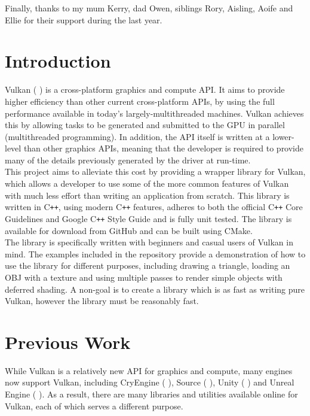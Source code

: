 \documentclass[12pt]{report}
\newcommand{\citebu}[1]{(\citenoparen{#1})}
\newcommand{\citenoparen}[1]{\citeauthor{#1} \citeyear{#1}}
\newcommand{\citesoftware}[1]{(\citeauthor{#1} \citeyear{#1})}
\newcommand{\cpp}{C\texttt{++}}
\theoremstyle{definition}
\begin{document}
    Finally, thanks to my mum Kerry, dad Owen, siblings Rory, Aisling, Aoife and Ellie for
    their support during the last year. \\

  \tableofcontents

  \listoffigures

  \chapter{Introduction}
    Vulkan \citesoftware{vulkan} is a cross-platform graphics and compute API.
    It aims to provide higher efficiency than other current
    cross-platform APIs, by using the full performance available in today's
    largely-multithreaded machines. Vulkan achieves this by allowing tasks to be
    generated and submitted to the GPU in parallel (multithreaded programming).
    In addition, the API itself is written at a lower-level than other graphics
    APIs, meaning that the developer is required to provide many of the details
    previously generated by the driver at run-time.\\

    This project aims to alleviate this cost by providing a wrapper library for
    Vulkan, which allows a developer to use some of the more common features of
    Vulkan with much less effort than writing an application from scratch. This
    library is written in \cpp{}, using modern \cpp{} features, adheres to both the
    official \cpp{} Core Guidelines and Google \cpp{} Style Guide and is fully unit
    tested. The library is available for download from GitHub and can be built
    using CMake.\\

    The library is specifically written with beginners and casual users of
    Vulkan in mind. The examples included in the repository provide a
    demonstration of how to use the library for different purposes, including
    drawing a triangle, loading an OBJ with a texture and using multiple passes
    to render simple objects with deferred shading. A non-goal is to create a
    library which is as fast as writing pure Vulkan, however the library
    must be reasonably fast.\\

  \chapter{Previous Work}

    While Vulkan is a relatively new API for graphics and compute, many engines
    now support Vulkan, including CryEngine \citebu{cryengine}, Source \citebu{source}, Unity \citebu{unity} and Unreal
    Engine \citebu{ue4}. As a result, there are many libraries and utilities available
    online for Vulkan, each of which serves a different purpose.
\end{document}
